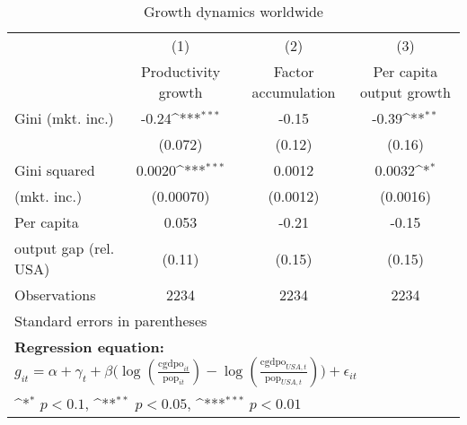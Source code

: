 \begin{table}[htbp]\centering
\def\sym#1{\ifmmode^{#1}\else\(^{#1}\)\fi}
\caption{Growth dynamics worldwide}
\begin{tabular}{l*{3}{c}}
\hline\hline
                &\multicolumn{1}{c}{(1)}&\multicolumn{1}{c}{(2)}&\multicolumn{1}{c}{(3)}\\
                &\multicolumn{1}{c}{Productivity growth}&\multicolumn{1}{c}{Factor accumulation}&\multicolumn{1}{c}{Per capita output growth}\\
\hline
Gini (mkt. inc.)&    -0.24\sym{***}&    -0.15         &    -0.39\sym{**} \\
                &  (0.072)         &   (0.12)         &   (0.16)         \\
[1em]
Gini squared    &   0.0020\sym{***}&   0.0012         &   0.0032\sym{*}  \\
(mkt. inc.)     &(0.00070)         & (0.0012)         & (0.0016)         \\
[1em]
Per capita      &    0.053         &    -0.21         &    -0.15         \\
output gap (rel. USA)&   (0.11)         &   (0.15)         &   (0.15)         \\
\hline
Observations    &     2234         &     2234         &     2234         \\
\hline\hline
\multicolumn{4}{l}{\footnotesize Standard errors in parentheses}\\
\multicolumn{4}{l}{\footnotesize \textbf{Regression equation:} \(g_{it} = \alpha + \gamma_t + \beta \big(\log (\frac{\textrm{cgdpo}_{it}}{\textrm{pop}_{it}} ) - \log (\frac{\textrm{cgdpo}_{USA,t}}{\textrm{pop}_{USA,t}}  ) \big) + \epsilon_{it}\)}\\
\multicolumn{4}{l}{\footnotesize \sym{*} \(p<0.1\), \sym{**} \(p<0.05\), \sym{***} \(p<0.01\)}\\
\end{tabular}
\end{table}
